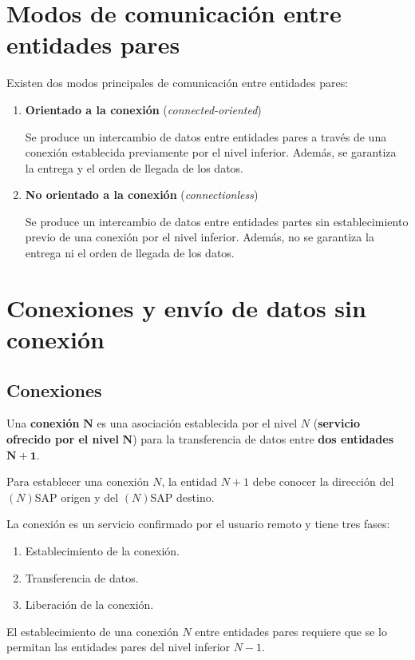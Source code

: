\documentclass[a4paper]{book}
\numberwithin{figure}{chapter}
\numberwithin{equation}{subsection}
\begin{document}
\section{Modos de comunicación entre entidades pares}
Existen dos modos principales de comunicación entre entidades pares:
\begin{enumerate}
  \item \textbf{Orientado a la conexión} (\textsl{connected-oriented})

        Se produce un intercambio de datos entre entidades pares a través de una conexión establecida previamente por el nivel inferior. Además, se garantiza la entrega y el orden de llegada de los datos.
  \item \textbf{No orientado a la conexión} (\textsl{connectionless})

        Se produce un intercambio de datos entre entidades partes sin establecimiento previo de una conexión por el nivel inferior. Además, no se garantiza la entrega ni el orden de llegada de los datos.
\end{enumerate}

\section{Conexiones y envío de datos sin conexión}

\subsection{Conexiones}
Una \textbf{conexión} $\mathbf{N}$ es una asociación establecida por el nivel $N$ (\textbf{servicio ofrecido por el nivel} $\mathbf{N}$) para la transferencia de datos entre \textbf{dos entidades} $\mathbf{N+1}$.

Para establecer una conexión $N$, la entidad $N+1$ debe conocer la dirección del $(N)$SAP origen y del $(N)$SAP destino.

La conexión es un servicio confirmado por el usuario remoto y tiene tres fases:
\begin{enumerate}
  \item Establecimiento de la conexión.
  \item Transferencia de datos.
  \item Liberación de la conexión.
\end{enumerate}

El establecimiento de una conexión $N$ entre entidades pares requiere que se lo permitan las entidades pares del nivel inferior $N-1$.
\end{document}
